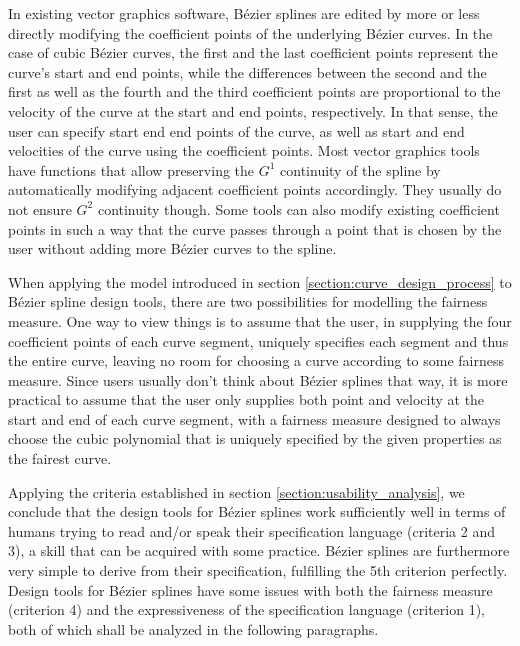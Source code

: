 \documentclass[a4paper]{article}
\begin{document}
				In existing vector graphics software, Bézier splines are edited by more or less directly modifying the coefficient points of the underlying Bézier curves. In the case of cubic Bézier curves, the first and the last coefficient points represent the curve's start and end points, while the differences between the second and the first as well as the fourth and the third coefficient points are proportional to the velocity of the curve at the start and end points, respectively. In that sense, the user can specify start end end points of the curve, as well as start and end velocities of the curve using the coefficient points. Most vector graphics tools have functions that allow preserving the \(G^1\) continuity of the spline by automatically modifying adjacent coefficient points accordingly. They usually do not ensure \(G^2\) continuity though. Some tools can also modify existing coefficient points in such a way that the curve passes through a point that is chosen by the user without adding more Bézier curves to the spline.

				When applying the model introduced in section \ref{section:curve_design_process} to Bézier spline design tools, there are two possibilities for modelling the fairness measure. One way to view things is to assume that the user, in supplying the four coefficient points of each curve segment, uniquely specifies each segment and thus the entire curve, leaving no room for choosing a curve according to some fairness measure. Since users usually don't think about Bézier splines that way, it is more practical to assume that the user only supplies both point and velocity at the start and end of each curve segment, with a fairness measure designed to always choose the cubic polynomial that is uniquely specified by the given properties as the fairest curve.

				Applying the criteria established in section \ref{section:usability_analysis}, we conclude that the design tools for Bézier splines work sufficiently well in terms of humans trying to read and/or speak their specification language (criteria 2 and 3), a skill that can be acquired with some practice. Bézier splines are furthermore very simple to derive from their specification, fulfilling the 5th criterion perfectly. Design tools for Bézier splines have some issues with both the fairness measure (criterion 4) and the expressiveness of the specification language (criterion 1), both of which shall be analyzed in the following paragraphs.
\end{document}
